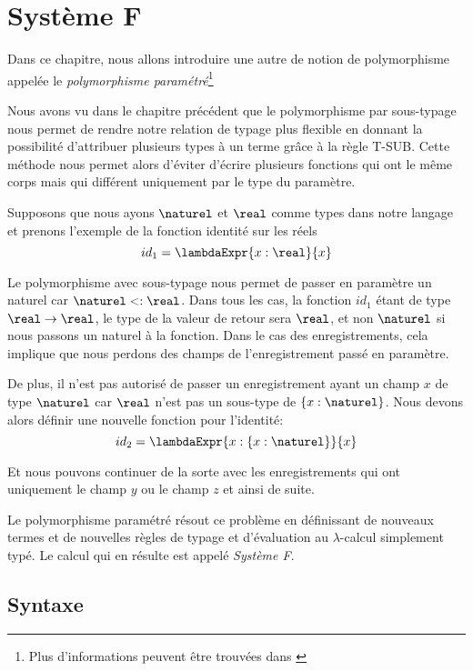 \chapter{Système F}
\label{chapter:system-f}

Dans ce chapitre, nous allons introduire une autre de notion de polymorphisme
appelée le \textit{polymorphisme paramétré}\footnote{Plus d'informations peuvent
être trouvées dans \cite{tapl-system-f}}

Nous avons vu dans le chapitre précédent que le polymorphisme par sous-typage
nous permet de rendre notre relation de typage plus flexible en donnant la
possibilité d'attribuer plusieurs types à un terme grâce à la règle T-SUB. Cette
méthode nous permet alors d'éviter
d'écrire plusieurs fonctions qui ont le même corps mais qui différent uniquement
par le type du paramètre.

Supposons que nous ayons $\naturel$ et $\real$ comme types dans notre langage et
prenons l'exemple de la fonction identité sur les réels
\begin{equation*}
  id_{1} = \lambdaExpr{x : \real}{x}
\end{equation*}

Le polymorphisme avec sous-typage nous permet de passer en paramètre un
naturel
car $\naturel <: \real$. Dans tous les cas, la fonction $id_{1}$ étant de type
$\real \rightarrow \real$, le type de la valeur de retour sera $\real$, et non
$\naturel$ si nous passons un naturel à la fonction.
Dans le cas des enregistrements, cela implique que nous perdons des
champs de l'enregistrement passé en paramètre.

De plus, il n'est pas autorisé de passer un
enregistrement ayant un champ $x$ de type $\naturel$ car $\real$ n'est pas
un sous-type de $\left\{ x : \naturel \right\}$. Nous devons alors définir une
nouvelle fonction pour l'identité:
\begin{equation*}
  id_{2} = \lambdaExpr{x : \left\{ x : \naturel \right\}}{x}
\end{equation*}

Et nous pouvons continuer de la sorte avec les enregistrements qui ont
uniquement le champ $y$ ou le champ $z$ et ainsi de suite.

Le polymorphisme paramétré résout ce problème en définissant de nouveaux termes
et de nouvelles règles de typage et d'évaluation au $\lambda$-calcul simplement
typé. Le calcul qui en résulte est appelé \textit{Système F}.

\section{Syntaxe}

